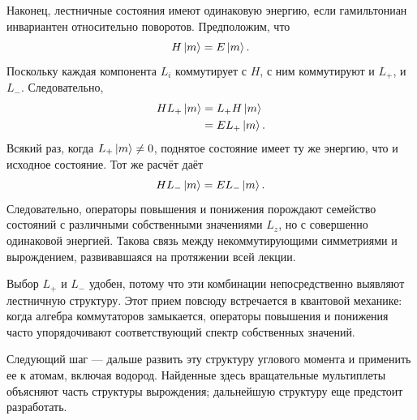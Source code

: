 Наконец, лестничные состояния имеют одинаковую энергию, если гамильтониан инвариантен относительно поворотов. Предположим, что
\begin{equation}
H\left\lvert m\right\rangle=E\left\lvert m\right\rangle.
\end{equation}
Поскольку каждая компонента \(L_i\) коммутирует с \(H\), с ним коммутируют и \(L_+\), и \(L_-\). Следовательно,
\begin{align}
H L_+\left\lvert m\right\rangle
&=L_+H\left\lvert m\right\rangle\\
&=E L_+\left\lvert m\right\rangle.
\end{align}
Всякий раз, когда \(L_+\left\lvert m\right\rangle\neq0\), поднятое состояние имеет ту же энергию, что и исходное состояние. Тот же расчёт даёт
\begin{equation}
H L_-\left\lvert m\right\rangle=E L_-\left\lvert m\right\rangle.
\end{equation}
Следовательно, операторы повышения и понижения порождают семейство состояний с различными собственными значениями \(L_z\), но с совершенно одинаковой энергией. Такова связь между некоммутирующими симметриями и вырождением, развивавшаяся на протяжении всей лекции.

\begin{classroomqa}
\end{classroomqa}

Выбор \(L_+\) и \(L_-\) удобен, потому что эти комбинации непосредственно выявляют лестничную структуру. Этот прием повсюду встречается в квантовой механике: когда алгебра коммутаторов замыкается, операторы повышения и понижения часто упорядочивают соответствующий спектр собственных значений.

\begin{classroomqa}
\end{classroomqa}

Следующий шаг — дальше развить эту структуру углового момента и применить ее к атомам, включая водород. Найденные здесь вращательные мультиплеты объясняют часть структуры вырождения; дальнейшую структуру еще предстоит разработать.

